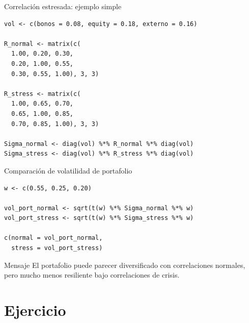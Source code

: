 \documentclass[aspectratio=169,11pt]{beamer}
\begin{document}
\begin{frame}[fragile]{Correlación estresada: ejemplo simple}
\begin{lstlisting}[style=Rstyle]
vol <- c(bonos = 0.08, equity = 0.18, externo = 0.16)

R_normal <- matrix(c(
  1.00, 0.20, 0.30,
  0.20, 1.00, 0.55,
  0.30, 0.55, 1.00), 3, 3)

R_stress <- matrix(c(
  1.00, 0.65, 0.70,
  0.65, 1.00, 0.85,
  0.70, 0.85, 1.00), 3, 3)

Sigma_normal <- diag(vol) %*% R_normal %*% diag(vol)
Sigma_stress <- diag(vol) %*% R_stress %*% diag(vol)
\end{lstlisting}
\end{frame}

\begin{frame}[fragile]{Comparación de volatilidad de portafolio}
\begin{lstlisting}[style=Rstyle]
w <- c(0.55, 0.25, 0.20)

vol_port_normal <- sqrt(t(w) %*% Sigma_normal %*% w)
vol_port_stress <- sqrt(t(w) %*% Sigma_stress %*% w)

c(normal = vol_port_normal,
  stress = vol_port_stress)
\end{lstlisting}

\begin{alertblock}{Mensaje}
El portafolio puede parecer diversificado con correlaciones normales, pero mucho menos resiliente bajo correlaciones de crisis.
\end{alertblock}
\end{frame}

\section{Ejercicio}
\end{document}
